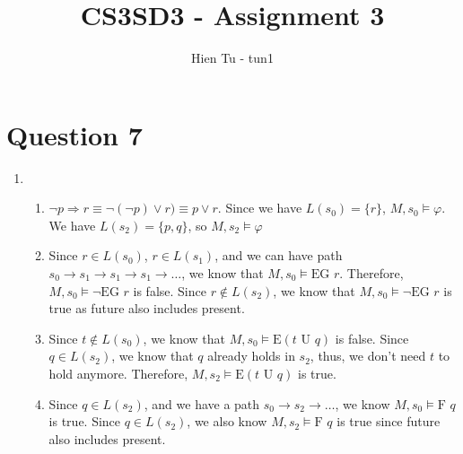 \documentclass{article}
\title{CS3SD3 - Assignment 3}
\author{Hien Tu - tun1}
\begin{document}
\maketitle

\section*{Question 7}
\begin{enumerate}[label=(\alph*)]
  \item \begin{enumerate}[label=(\roman*)]
          \item $\neg p \Rightarrow r \equiv \neg (\neg p) \lor r) \equiv p \lor
                r$. Since we have $L(s_0) = \{r\}$, $M, s_0 \vDash \varphi$. We
                have $L(s_2) = \{p, q\}$, so $M, s_2 \vDash \varphi$
          \item Since $r \in L(s_0)$, $r \in L(s_1)$, and we can have path $s_0
                \rightarrow s_1 \rightarrow s_1 \rightarrow s_1 \rightarrow
                \dots$, we know that $M, s_0 \vDash \text{EG } r$. Therefore,
                $M, s_0 \vDash \neg \text{EG } r$ is false. Since $r \not \in
                L(s_2)$, we know that $M, s_0 \vDash \neg \text{EG } r$ is true
                as future also includes present.
          \item Since $t \not \in L(s_0)$, we know that $M, s_0 \vDash
                \text{E}(t \text{ U } q)$ is false. Since $q \in L(s_2)$, we
                know that $q$ already holds in $s_2$, thus, we don't need $t$ to
                hold anymore. Therefore, $M, s_2 \vDash \text{E}(t \text{ U }
                q)$ is true.
          \item Since $q \in L(s_2)$, and we have a path $s_0 \rightarrow s_2
                \rightarrow \dots$, we know $M, s_0 \vDash \text{F } q$ is true.
                Since $q \in L(s_2)$, we also know $M, s_2 \vDash \text{F } q$
                is true since future also includes present.
        \end{enumerate}
\end{enumerate}
  
\end{document}
